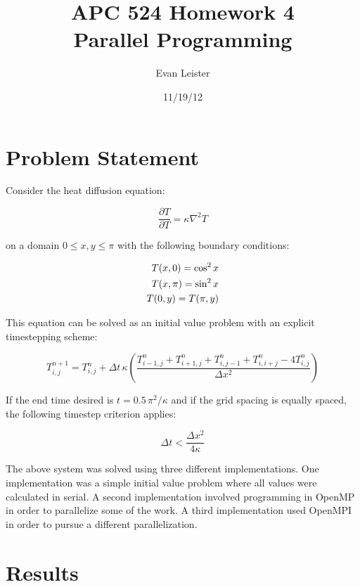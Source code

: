 \documentclass{article}
\title{ APC 524 Homework 4 \\
        Parallel Programming}
\author{Evan Leister}
\date {11/19/12}
\begin{document}
\maketitle

  \section{Problem Statement}

  Consider the heat diffusion equation: 

  \begin{equation}
    \frac{\partial T}{ \partial T} = \kappa \nabla^2 T
  \end{equation}

  on a domain $ 0 \leq x,y \leq \pi$ with the following boundary conditions:

  \begin{equation}
    \centering
    \begin{aligned}
      T(x,0) = \cos^2 x \\
      T(x,\pi) = \sin^2 x \\
      T(0,y) = T(\pi,y)
    \end{aligned}
  \end{equation}

  This equation can be solved as an initial value problem with an explicit timestepping scheme:

  \begin{equation}
    T_{i,j}^{n+1} = T_{i,j}^n + \Delta t \, \kappa \left( \frac{T_{i-1,j}^n + T_{i+1,j}^n + T_{i,j-1}^n + T_{i,i+j}^n - 4 T_{i,j}^n}{\Delta x ^2  }\right)
  \end{equation}

  If the end time desired is $t = 0.5 \, \pi^2 / \kappa$ and  if the grid spacing is equally spaced, the following timestep criterion applies:

  \begin{equation}
    \Delta t < \frac{\Delta x^2}{4 \kappa} 
  \end{equation}

  The above system was solved using three different implementations. 
  One implementation was a simple initial value problem where all values were calculated in serial.
  A second implementation involved programming in OpenMP in order to parallelize some of the work.
  A third implementation used OpenMPI in order to pursue a different parallelization. 

  \clearpage
  \section{Results}
\end{document}
